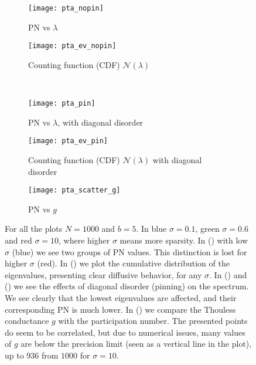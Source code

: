\begin{figure}[H]
  \begin{subfigure}{.45\linewidth}\centering
    \texttt{[image: pta\_nopin]}
    \caption{PN vs $\lambda$}\label{fig:PN_kottos_nopin}
  \end{subfigure}
  \begin{subfigure}{.45\linewidth}\centering
     \texttt{[image: pta\_ev\_nopin]}
  \caption{Counting function (CDF) $\mathcal{N}(\lambda)$}\label{fig:ev_dist}
  \end{subfigure}\\ %
    \begin{subfigure}{.45\linewidth}\centering
    \texttt{[image: pta\_pin]}
    \caption{PN vs $\lambda$, with diagonal disorder}\label{fig:PN_kottos_pinning}
  \end{subfigure}     
  \begin{subfigure}{.45\linewidth}\centering
     \texttt{[image: pta\_ev\_pin]}
  \caption{Counting function (CDF) $\mathcal{N}(\lambda)$ with diagonal disorder}\label{fig:ev_dist_pin}
  \end{subfigure}
    \begin{subfigure}{.45\linewidth}\centering
    \texttt{[image: pta\_scatter\_g]}
  \caption{PN vs $g$}\label{fig:PN_g_scatter}
  \end{subfigure}
  \caption{For all the plots $N=1000$ and $b=5$. 
           In blue $\sigma=0.1$, green $\sigma=0.6$ and red $\sigma=10$, where higher
           $\sigma$ means more sparsity.
           In () with low $\sigma$ (blue) we see two groups of PN values.
           This distinction is lost for higher $\sigma$ (red).
           In () we plot the cumulative distribution of
           the eigenvalues, presenting clear diffusive behavior, for any $\sigma$.
           In () and ()
           we see the effects of diagonal disorder (pinning)
           on the spectrum. We see clearly that the lowest eigenvalues 
           are affected, and their corresponding PN is much lower.
           In () we compare the Thouless conductance
           $g$ with the participation number. 
           The presented points do seem to be correlated, but due to numerical issues,
           many values of $g$ are below the precision limit (seen as a vertical line in the plot), 
           up to $936$ from $1000$ for $\sigma=10$. 
  }
\end{figure}



